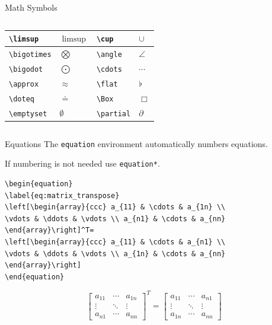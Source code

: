 \documentclass{beamer}
\begin{document}
\begin{frame}[fragile]{Math Symbols}
\begin{columns}
\begin{column}{5.5cm}
\begin{center}
\begin{tabular}{| l l | l l|}
\hline
\verb!\limsup! & $\limsup$ & \verb!\cup! & $\cup$
\\
\hline
\verb!\bigotimes! & $\bigotimes$ & \verb!\angle! & $\angle$
\\
\hline
\verb!\bigodot! & $\bigodot$ & \verb!\cdots! & $\cdots$
\\
\hline
\verb!\approx! & $\approx$ & \verb!\flat! & $\flat$
\\
\hline
\verb!\doteq! & $\doteq$ & \verb!\Box! & $\Box$
\\
\hline
\verb!\emptyset! & $\emptyset$ & \verb!\partial! & $\partial$
\\
\hline
\end{tabular}
\end{center}
\end{column}
\end{columns}
\end{frame}

\begin{frame}[fragile]{Equations}
The \texttt{equation} environment automatically numbers equations. 

If numbering is not needed use \texttt{equation*}.
\begin{lstlisting}
\begin{equation}
\label{eq:matrix_transpose}
\left[\begin{array}{ccc} a_{11} & \cdots & a_{1n} \\
\vdots & \ddots & \vdots \\ a_{n1} & \cdots & a_{nn}
\end{array}\right]^T= 
\left[\begin{array}{ccc} a_{11} & \cdots & a_{n1} \\
\vdots & \ddots & \vdots \\ a_{1n} & \cdots & a_{nn}
\end{array}\right]
\end{equation}
\end{lstlisting}

\begin{equation}
\label{eq:matrix_transpose}
\left[
\begin{array}{ccc}
a_{11} & \cdots & a_{1n} \\
\vdots & \ddots & \vdots \\
a_{n1} & \cdots & a_{nn}
\end{array}
\right]^T
= 
\left[
\begin{array}{ccc}
a_{11} & \cdots & a_{n1} \\
\vdots & \ddots & \vdots \\
a_{1n} & \cdots & a_{nn}
\end{array}
\right]
\end{equation}
\end{frame}
\end{document}
